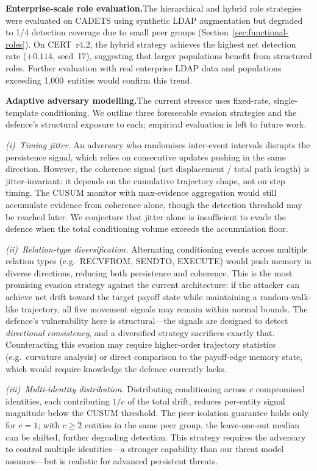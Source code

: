 \documentclass[10pt,twocolumn]{article}
\begin{document}
\textbf{Enterprise-scale role evaluation.}\quad The hierarchical and
hybrid role strategies were evaluated on CADETS using synthetic LDAP
augmentation but degraded to 1/4 detection coverage due to small peer
groups (Section~\ref{sec:functional-roles}).  On CERT~r4.2, the hybrid
strategy achieves the highest net detection rate ($+0.114$, seed~17),
suggesting that larger populations benefit from structured roles.
Further evaluation with real enterprise LDAP data and populations
exceeding 1,000~entities would confirm this trend.

\textbf{Adaptive adversary modelling.}\quad The current stressor uses
fixed-rate, single-template conditioning.  We outline three foreseeable
evasion strategies and the defence's structural exposure to each; empirical
evaluation is left to future work.

\emph{(i)~Timing jitter.}  An adversary who randomises inter-event
intervals disrupts the persistence signal, which relies on consecutive
updates pushing in the same direction.  However, the coherence signal
(net displacement / total path length) is jitter-invariant: it depends
on the cumulative trajectory shape, not on step timing.  The CUSUM
monitor with max-evidence aggregation would still accumulate evidence
from coherence alone, though the detection threshold may be reached
later.  We conjecture that jitter alone is insufficient to evade the
defence when the total conditioning volume exceeds the accumulation floor.

\emph{(ii)~Relation-type diversification.}  Alternating conditioning
events across multiple relation types (e.g.\ RECVFROM, SENDTO, EXECUTE)
would push memory in diverse directions, reducing both persistence and
coherence.  This is the most promising evasion strategy against the
current architecture: if the attacker can achieve net drift toward the
target payoff state while maintaining a random-walk-like trajectory, all
five movement signals may remain within normal bounds.  The defence's
vulnerability here is structural---the signals are designed to detect
\emph{directional consistency}, and a diversified strategy sacrifices
exactly that.  Counteracting this evasion may require higher-order
trajectory statistics (e.g.\ curvature analysis) or direct comparison
to the payoff-edge memory state, which would require knowledge the
defence currently lacks.

\emph{(iii)~Multi-identity distribution.}  Distributing conditioning
across $c$ compromised identities, each contributing $1/c$ of the total
drift, reduces per-entity signal magnitude below the CUSUM threshold.
The peer-isolation guarantee holds only for $c=1$; with $c \geq 2$
entities in the same peer group, the leave-one-out median can be shifted,
further degrading detection.  This strategy requires the adversary to
control multiple identities---a stronger capability than our threat model
assumes---but is realistic for advanced persistent threats.
\end{document}
